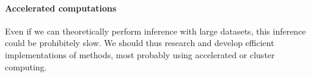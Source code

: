 \paragraph{Accelerated computations}

Even if we can theoretically perform inference with large datasets, this
inference could be prohibitely slow. We should thus research and develop
efficient implementations of methods, most probably using accelerated or
cluster computing.


